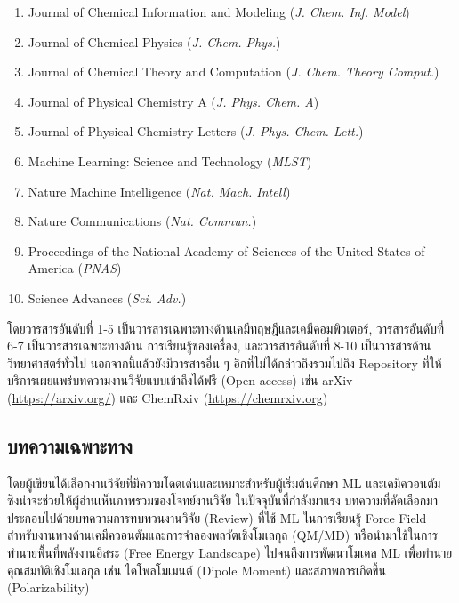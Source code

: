 \begin{enumerate}[topsep=0pt,noitemsep]
    \item Journal of Chemical Information and Modeling (\textit{J. Chem. Inf. Model}) 
    
    \item Journal of Chemical Physics (\textit{J. Chem. Phys.}) 
    
    \item Journal of Chemical Theory and Computation (\textit{J. Chem. Theory Comput.}) 
    
    \item Journal of Physical Chemistry A (\textit{J. Phys. Chem. A}) 
    
    \item Journal of Physical Chemistry Letters (\textit{J. Phys. Chem. Lett.}) 
    
    \item Machine Learning: Science and Technology (\textit{MLST}) 
    
    \item Nature Machine Intelligence (\textit{Nat. Mach. Intell}) 
    
    \item Nature Communications (\textit{Nat. Commun.})
    
    \item Proceedings of the National Academy of Sciences of the United States of America (\textit{PNAS}) 
    
    \item Science Advances (\textit{Sci. Adv.}) 
\end{enumerate}

\noindent โดยวารสารอันดับที่ 1-5 เป็นวารสารเฉพาะทางด้านเคมีทฤษฎีและเคมีคอมพิวเตอร์, วารสารอันดับที่ 6-7 เป็นวารสารเฉพาะทางด้าน%
การเรียนรู้ของเครื่อง, และวารสารอันดับที่ 8-10 เป็นวารสารด้านวิทยาศาสตร์ทั่วไป นอกจากนี้แล้วยังมีวารสารอื่น ๆ อีกที่ไม่ได้กล่าวถึงรวมไปถึง
Repository ที่ให้บริการเผยแพร่บทความงานวิจัยแบบเข้าถึงได้ฟรี (Open-access) เช่น arXiv (\url{https://arxiv.org/}) และ 
ChemRxiv (\url{https://chemrxiv.org})

\subsection{บทความเฉพาะทาง}
\label{ssec:pred_misc_papers_specific}

โดยผู้เขียนได้เลือกงานวิจัยที่มีความโดดเด่นและเหมาะสำหรับผู้เริ่มต้นศึกษา ML และเคมีควอนตัม ซึ่งน่าจะช่วยให้ผู้อ่านเห็นภาพรวมของโจทย์งานวิจัย%
ในปัจจุบันที่กำลังมาแรง บทความที่คัดเลือกมาประกอบไปด้วยบทความการทบทวนงานวิจัย (Review) ที่ใช้ ML ในการเรียนรู้ Force Field 
สำหรับงานทางด้านเคมีควอนตัมและการจําลองพลวัตเชิงโมเลกุล (QM/MD) หรือนำมาใช้ในการทำนายพื้นที่พลังงานอิสระ (Free Energy Landscape)
ไปจนถึงการพัฒนาโมเดล ML เพื่อทำนายคุณสมบัติเชิงโมเลกุล เช่น ไดโพลโมเมนต์ (Dipole Moment) และสภาพการเกิดขึ้น (Polarizability)


